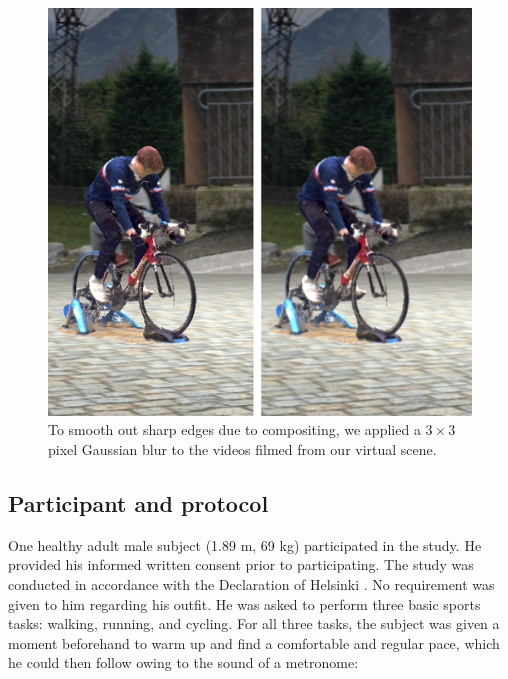 \begin{figure}[!ht]
	\centering
	\def\svgwidth{1\columnwidth}
	\fontsize{10pt}{10pt}\selectfont
	\includegraphics[width=.98\linewidth]{"../Chap4/Figures/Fig_Smooth.png"}
	\caption{To smooth out sharp edges due to compositing, we applied a \(3 \times 3\) pixel Gaussian blur to the videos filmed from our virtual scene.}
	\label{fig_smooth}
\end{figure}


\subsection{Participant and protocol}

One healthy adult male subject (1.89 m, 69 kg) participated in the study. He provided his informed written consent prior to participating. The study was conducted in accordance with the Declaration of Helsinki \cite{Holm2013}. No requirement was given to him regarding his outfit. He was asked to perform three basic sports tasks: walking, running, and cycling. For all three tasks, the subject was given a moment beforehand to warm up and find a comfortable and regular pace, which he could then follow owing to the sound of a metronome:

